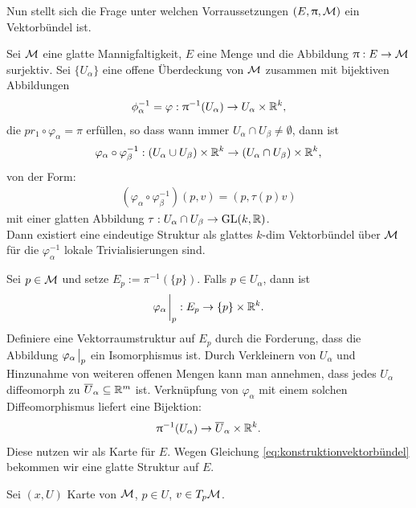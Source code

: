 Nun stellt sich die Frage unter welchen Vorraussetzungen $(E, \uppi, \mathcal{M})$ ein Vektorbündel ist.
\begin{lem}
\label{lem:vorraussetzungenvektorbündel}
Sei $\mathcal{M}$ eine glatte Mannigfaltigkeit, $E$ eine Menge und die Abbildung $\uppi: E\to\mathcal{M}$ surjektiv.
Sei $\{ U_\alpha \}$ eine offene Überdeckung von $\mathcal{M}$ zusammen mit bijektiven Abbildungen
\begin{align*}
\phi^{-1}_{\alpha} = \varphi: \uppi^{-1}(U_\alpha) \to U_\alpha \times \mathbb{R}^k,
\end{align*}
die $pr_1 \circ \varphi_\alpha = \pi$ erfüllen, so dass wann immer $U_\alpha \cap U_\beta \neq \emptyset$, dann ist 
\begin{align*}
\varphi_\alpha \circ \varphi_{\beta}^{-1} : (U_\alpha \cup U_\beta) \times \mathbb{R}^k \to (U_\alpha \cap U_\beta) \times \mathbb{R}^k,
\end{align*}
von der Form:
\begin{align*}
\label{eq:konstruktionvektorbündel}
(\varphi_\alpha \circ \varphi_{\beta}^{-1})(p, v) = (p, \tau(p) v)
\end{align*}
mit einer glatten Abbildung $\tau: U_\alpha \cap U_\beta \to \mathrm{GL}(k, \mathbb{R})$.\\
Dann existiert eine eindeutige Struktur als glattes $k$-dim Vektorbündel über $\mathcal{M}$ für die $\varphi^{-1}_{\alpha}$ lokale Trivialisierungen sind.
\end{lem}
\begin{bew}
Sei  $p\in\mathcal{M}$ und setze $E_p := \pi^{-1}(\{ p \})$. 
Falls $p\in U_\alpha$, dann ist 
\begin{align*}
\varphi_\alpha \eval_p : E_p \to \{ p \} \times \R^k.
\end{align*}
Definiere eine Vektorraumstruktur auf $E_p$ durch die Forderung, dass die Abbildung $\varphi_\alpha \eval_p$ ein Isomorphismus ist.
Durch Verkleinern von $U_\alpha$ und Hinzunahme von weiteren offenen Mengen kann man annehmen, dass jedes $U_\alpha$ diffeomorph zu $\overline{U}_\alpha \subseteq \mathbb{R}^m$ ist.
Verknüpfung von $\varphi_\alpha$ mit einem solchen Diffeomorphismus liefert eine Bijektion:
\begin{align*}
\uppi^{-1} (U_\alpha) \to \overline{U}_\alpha \times \mathbb{R}^k .
\end{align*}
Diese nutzen wir als Karte für $E$.
Wegen Gleichung \ref{eq:konstruktionvektorbündel} bekommen wir eine glatte Struktur auf $E$.
\end{bew}
Sei $(x, U)$ Karte von $\mathcal{M}$, $p\in U$, $v\in T_p \mathcal{M}$.
